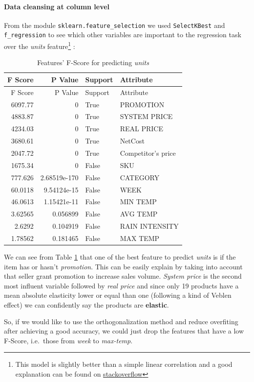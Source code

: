 \documentclass[]{article}
\let\oldparagraph\paragraph
\renewcommand{\paragraph}[1]{\oldparagraph{#1}\mbox{}}
\let\rmarkdownfootnote\footnote%
\def\footnote{\protect\rmarkdownfootnote}
\theoremstyle{definition}
\theoremstyle{definition}
\theoremstyle{definition}
\theoremstyle{remark}
\begin{document}
\paragraph{Data cleansing at column
level}\label{data-cleansing-at-column-level}

From the module \texttt{sklearn.feature\_selection} we used
\texttt{SelectKBest} and \texttt{f\_regression} to see which other
variables are important to the regression task over the \emph{units}
feature\footnote{This model is slightly better than a simple linear
  correlation and a good explanation can be found on
  \href{https://stats.stackexchange.com/questions/204141/difference-between-selecting-features-based-on-f-regression-and-based-on-r2}{stackoverflow}}
:

\begin{longtable}[]{@{}rrll@{}}
\caption{\label{tab:tab1} Features' F-Score for predicting
\emph{units}}\tabularnewline
\toprule
F Score & P Value & Support & Attribute\tabularnewline
\midrule
\endfirsthead
\toprule
F Score & P Value & Support & Attribute\tabularnewline
\midrule
\endhead
6097.77 & 0 & True & PROMOTION\tabularnewline
4883.87 & 0 & True & SYSTEM PRICE\tabularnewline
4234.03 & 0 & True & REAL PRICE\tabularnewline
3680.61 & 0 & True & NetCost\tabularnewline
2047.72 & 0 & True & Competitor's price\tabularnewline
1675.34 & 0 & False & SKU\tabularnewline
777.626 & 2.68519e-170 & False & CATEGORY\tabularnewline
60.0118 & 9.54124e-15 & False & WEEK\tabularnewline
46.0613 & 1.15421e-11 & False & MIN TEMP\tabularnewline
3.62565 & 0.056899 & False & AVG TEMP\tabularnewline
2.6292 & 0.104919 & False & RAIN INTENSITY\tabularnewline
1.78562 & 0.181465 & False & MAX TEMP\tabularnewline
\bottomrule
\end{longtable}

We can see from Table \ref{tab:tab1} that one of the best feature to
predict \emph{units} is if the item has or hasn't \emph{promotion}. This
can be easily explain by taking into account that seller grant promotion
to increase sales volume. \emph{System price} is the second most
influent variable followed by \emph{real price} and since only 19
products have a mean absolute elasticity lower or equal than one
(following a kind of Veblen effect) we can confidently say the products
are \textbf{elastic}.

So, if we would like to use the orthogonalization method and reduce
overfiting after achieving a good accuracy, we could just drop the
features that have a low F-Score, i.e.~those from \emph{week} to
\emph{max-temp}.
\end{document}
